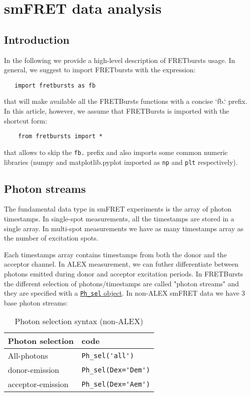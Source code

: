 \section{smFRET data analysis}

\subsection{Introduction}

In the following we provide a high-level description of FRETbursts usage. In general, we suggest to import FRETbursts with the expression:

\begin{verbatim}
   import fretbursts as fb
\end{verbatim}


that will make available all the FRETBursts functions with a concise `fb.` prefix. In this article, however, we assume that FRETBursts is imported with the shortcut form:

\begin{verbatim}
    from fretbursts import *
\end{verbatim}

that allows to skip the \verb|fb.| prefix and also imports some common numeric libraries (numpy and matplotlib.pyplot imported as \verb|np| and \verb|plt| respectively).

\subsection{Photon streams}

The fundamental data type in smFRET experiments is the array of photon timestamps. In single-spot measurements, all the timestamps are stored in a single array. In multi-spot measurements we have as many timestamps array as the number of excitation spots.

Each timestamps array contains timestamps from both the donor and the acceptor channel. In ALEX measurement, we can futher differentiate between photons emitted during donor and acceptor excitation periods. In FRETBursts the different selection of photons/timestamps are called "photon streams" and they are specified with a \href{http://fretbursts.readthedocs.org/en/latest/data_class.html#module-fretbursts.ph_sel}{\verb|Ph_sel| object}. In non-ALEX smFRET data we have 3 base photon streams: 

\begin{table}
\centering
\begin{tabular}{l|l}
  Photon selection  & code \\
  \hline
  All-photons       & \verb|Ph_sel('all')|\\
  donor-emission    & \verb|Ph_sel(Dex='Dem')|\\
  acceptor-emission & \verb|Ph_sel(Dex='Aem')|\\
\end{tabular}
\caption{\label{tab:ph_sel_smfret}Photon selection syntax (non-ALEX)}
\end{table}

